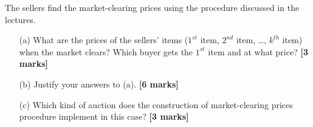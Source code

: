 \documentclass{article}
\begin{document}
\begin{enumerate}
	\noindent The sellers find the market-clearing prices using the procedure discussed in the lectures.
	\begin{enumerate}
		\item[(a)] What are the prices of the sellers' items ($1^{st}$ item, $2^{nd}$ item, \ldots, $k^{th}$ item) when the market clears? Which buyer gets the $1^{st}$ item and at what price?  \hfill{\bf [3 marks]}\smallskip
		\item[(b)] Justify your answers to (a).  \hfill{\bf [6 marks]}\smallskip
		\item[(c)] Which kind of auction does the construction of market-clearing prices procedure implement in this case?  \hfill{\bf [3 marks]}\smallskip
	\end{enumerate}	

\end{enumerate}
\end{document}
